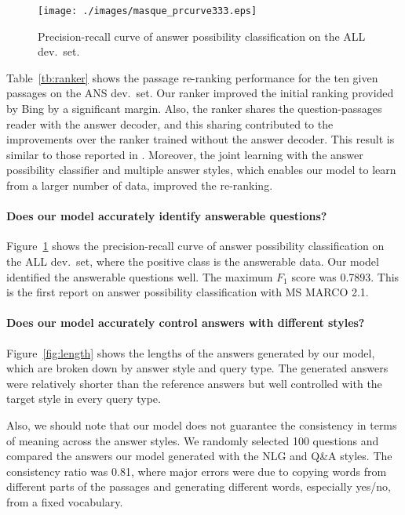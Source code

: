 \documentclass[11pt,a4paper]{article}
\theoremstyle{mydef}
\theoremstyle{myprob}
\begin{document}
\begin{figure}[t!]
\centering
\texttt{[image: ./images/masque\_prcurve333.eps]}
\caption{Precision-recall curve of answer possibility classification on the ALL dev.~set.}
\label{fig:anspos}
\end{figure}

Table~\ref{tb:ranker} shows the passage re-ranking performance for the ten given passages on the ANS dev.~set. Our ranker improved the initial ranking provided by Bing by a significant margin. Also, the ranker shares the question-passages reader with the answer decoder, and this sharing contributed to the improvements over the ranker trained without the answer decoder. 
This result is similar to those reported in \citep{NishidaSOAT18}.
Moreover, the joint learning with the answer possibility classifier and multiple answer styles, which enables our model to learn from a larger number of data, improved the re-ranking. 
 
\paragraph{Does our model accurately identify answerable questions?}

Figure~\ref{fig:anspos} shows the precision-recall curve of answer possibility classification on the ALL dev.~set, where the positive class is the answerable data. Our model identified the answerable questions well. The maximum $F_1$ score was 0.7893. 
This is the first report on answer possibility classification with MS MARCO 2.1.

\paragraph{Does our model accurately control answers with different styles?}
Figure~\ref{fig:length} shows the lengths of the answers generated by our model, which are broken down by answer style and query type.
The generated answers were relatively shorter than the reference answers but well controlled with the target style in every query type.

Also, we should note that our model does not guarantee the consistency in terms of meaning across the answer styles. We randomly selected 100 questions and compared the answers our model generated with the NLG and Q\&A styles.  
The consistency ratio was 0.81, where major errors were due to copying words from different parts of the passages and generating different words, especially yes/no, from a fixed vocabulary.
\end{document}
